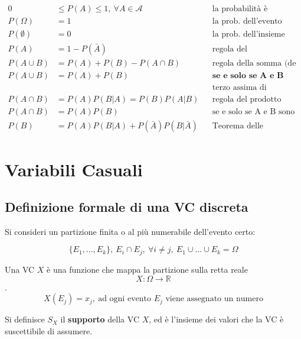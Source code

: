 \documentclass[
  11pt,
]{book}
\theoremstyle{mytheoremstyle}
\theoremstyle{mydefstyle}
\begin{document}
\begin{info2}

\begin{align*}
0&\le P(A) \le 1,~\forall A\in\mathscr{A} &&\text{la probabilità è compresa tra 0 e 1.} \\ 
 P(\Omega)&=1 &&\text{la prob. dell'evento certo è 1,} \\ 
P(\emptyset)&=0 &&\text{la prob. dell'insieme vuoto è zero.} \\ 
P(A)&=1-P(\bar A) &&\text{regola del complementare} \\ 
P(A\cup B)&=P(A)+P(B)-P(A\cap B) &&\text{regola della somma (de Morgan)} \\ 
P(A\cup B)&=P(A)+P(B) &&\textbf{se e solo se A e B sono incompatibili:} \\ 
& &&\text{terzo assima di Kolmogorov} \\ 
P(A\cap B)&=P(A)P(B|A)=P(B)P(A|B) &&\text{regola del prodotto (chain rule)} \\ 
P(A\cap B)&=P(A)P(B) &&\text{se e solo se A e B sono indipendenti} \\ 
P(B)&=P(A)P(B|A)+P(\bar A)P(B|\bar A) &&\text{Teorema delle probabilità totali} 
\end{align*}

\end{info2}

\normalsize

\chapter{Variabili Casuali}\label{variabili-casuali}

\section{Definizione formale di una VC discreta}\label{definizione-formale-di-una-vc-discreta}

Si consideri un partizione finita o al più numerabile dell'evento certo:

\[
\{E_1,...,E_k\},~E_i\cap E_j,~\forall i\ne j, ~E_1\cup...\cup E_k=\Omega
\]

Una VC \(X\) è una funzione che mappa la partizione sulla retta reale \[X:\Omega\to\mathbb{R}\]. \[X(E_j)=x_j,~\text{ad ogni evento $E_j$ viene assegnato un numero}\]

Si definisce \(S_X\) il \textbf{supporto} della VC \(X\), ed è l'insieme dei valori che la VC è suscettibile di assumere.
\end{document}
